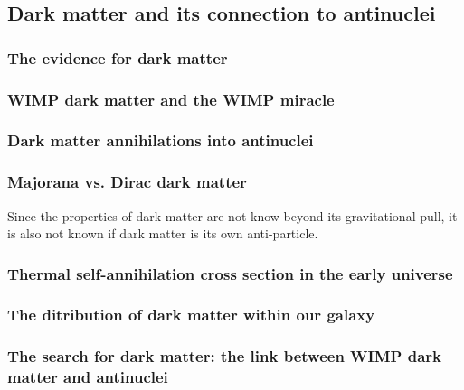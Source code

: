 \subsection{Dark matter and its connection to antinuclei}

\subsubsection{The evidence for dark matter}
\subsubsection{WIMP dark matter and the WIMP miracle}\label{sec:IntroWIMPs}
\subsubsection{Dark matter annihilations into antinuclei}
\subsubsection{Majorana vs. Dirac dark matter}\label{sec:IntroMajoranaDiracDM}
Since the properties of dark matter are not know beyond its gravitational pull, it is also not known if dark matter is its own anti-particle. 
\subsubsection{Thermal self-annihilation cross section in the early universe}
\subsubsection{The ditribution of dark matter within our galaxy}
\subsubsection{The search for dark matter: the link between WIMP dark matter and antinuclei}